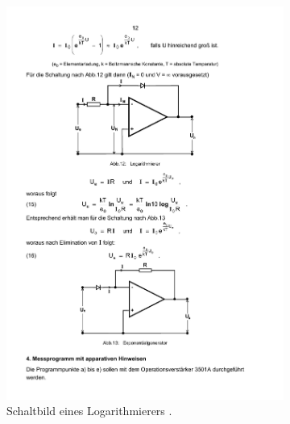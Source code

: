 \begin{figure}
    \begin{subfigure}{.49\linewidth}
        \centering
        \includegraphics[width=1.0\linewidth]{img/log.pdf}
        \caption{Schaltbild eines Logarithmierers \cite{V51}.}
        \label{fig:log}
    \end{subfigure}
    \begin{subfigure}{.49\linewidth}
        \centering

\end{subfigure}
\end{figure}
